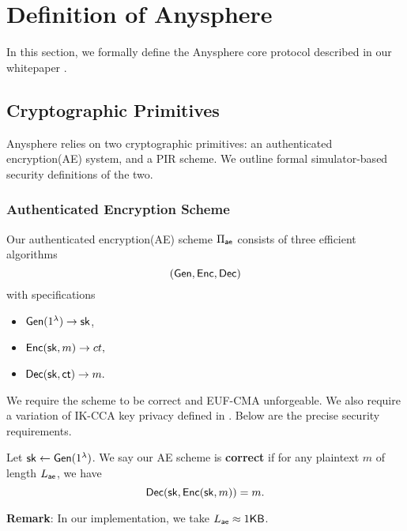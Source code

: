 \section{Definition of Anysphere}
\label{sec:asphr-defn}
In this section, we formally define the Anysphere core protocol described in our whitepaper \cite{whitepaper}. 
\subsection{Cryptographic Primitives}
Anysphere relies on two cryptographic primitives: an authenticated encryption(AE) system, and a PIR scheme. We outline formal simulator-based security definitions of the two. 

\subsubsection{Authenticated Encryption Scheme}
\label{subsec:AE}
Our authenticated encryption(AE) scheme $\Pi_{\mathsf{ae}}$ consists of three efficient algorithms 
$$(\mathsf{Gen}, \mathsf{Enc}, \mathsf{Dec})$$
with specifications
\begin{itemize}
    \item $\mathsf{Gen}(1^{\lambda}) \to {\ensuremath{\mathsf{sk}}}$,
    \item $\mathsf{Enc}({\mathsf{sk}}, m) \to ct,$
    \item $\mathsf{Dec}({\mathsf{sk}}, \mathsf{ct}) \to m.$
\end{itemize}
We require the scheme to be correct and EUF-CMA unforgeable. We also require a variation of IK-CCA key privacy defined in \cite{BBDP01keyprivate}. Below are the precise security requirements.

\begin{definition}
\label{defn:AE-correctness}
Let ${\mathsf{sk}} \leftarrow \mathsf{Gen}(1^{\lambda})$. We say our AE scheme is \textbf{correct} if for any plaintext $m$ of length $L_{\mathsf{ae}}$, we have
$$\mathsf{Dec}({\mathsf{sk}}, \mathsf{Enc}({\mathsf{sk}}, m)) = m.$$
\end{definition}
\textbf{Remark}: In our implementation, we take $L_{\mathsf{ae}} \approx 1 \mathsf{KB}$.

